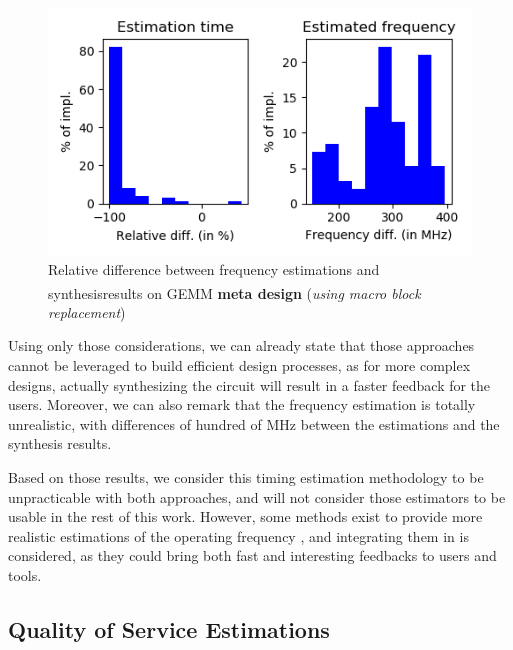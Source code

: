         \begin{figure}[h!]
            \centering
            \includegraphics[width=1.0\textwidth]{Figures/results/gemmTimingWithMacro}
            \caption[Quality of frequency estimations on GEMM]{Relative difference between frequency estimations and synthesis\newline results on GEMM {\bf meta design}\textsuperscript{\styx} ({\it using macro block replacement})}
            \label{ch.expe:sec.strategies:ssec.timing:fig.gemm}
        \end{figure}

       Using only those considerations, we can already state that those approaches cannot be leveraged to build efficient design processes, as for more complex designs, actually synthesizing the circuit will result in a faster feedback for the users.
       Moreover, we can also remark that the frequency estimation is totally unrealistic, with differences of hundred of MHz between the estimations and the synthesis results.
        
       Based on those results, we consider this timing estimation methodology to be unpracticable with both approaches, and will not consider those estimators to be usable in the rest of this work.
       However, some methods exist to provide more realistic estimations of the operating frequency \cite{kwon_transfer_2020}\cite{paletti_dovado_2021}, and integrating them in  is considered, as they could bring both fast and interesting feedbacks to users and tools.

    \subsection{Quality of Service Estimations}
    \label{ch.expe:sec.estimators:ssec.qos}

